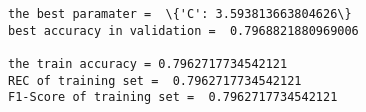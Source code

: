 \documentclass[11pt]{article}
\begin{document}
    \begin{Verbatim}[commandchars=\\\{\}]
the best paramater =  \{'C': 3.593813663804626\}
best accuracy in validation =  0.7968821880969006

the train accuracy = 0.7962717734542121
REC of training set =  0.7962717734542121
F1-Score of training set =  0.7962717734542121


    \end{Verbatim}

    \begin{center}
    \end{center}
    { \hspace*{\fill} \\}
    
\end{document}
